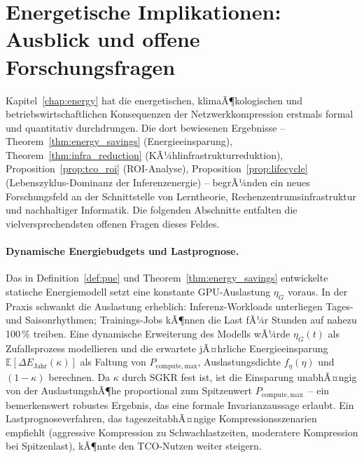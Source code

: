 ﻿\documentclass[12pt, a4paper, openany]{report}
\newcommand{\E}{\mathbb{E}}
\begin{document}
\section{Energetische Implikationen: Ausblick und offene Forschungsfragen}
\label{sec:outlook_energy}

Kapitel~\ref{chap:energy} hat die energetischen, klimaÃ¶kologischen und
betriebswirtschaftlichen Konsequenzen der Netzwerkkompression erstmals
formal und quantitativ durchdrungen.  Die dort bewiesenen Ergebnisse
-- Theorem~\ref{thm:energy_savings} (Energieeinsparung),
Theorem~\ref{thm:infra_reduction} (KÃ¼hlinfrastrukturreduktion),
Proposition~\ref{prop:tco_roi} (ROI-Analyse),
Proposition~\ref{prop:lifecycle} (Lebenszyklus-Dominanz der Inferenzenergie)
-- begrÃ¼nden ein neues Forschungsfeld an der Schnittstelle von
Lerntheorie, Rechenzentrumsinfrastruktur und nachhaltiger Informatik.
Die folgenden Abschnitte entfalten die vielversprechendsten offenen
Fragen dieses Feldes.

\paragraph{Dynamische Energiebudgets und Lastprognose.}
Das in Definition~\ref{def:pue} und Theorem~\ref{thm:energy_savings}
entwickelte statische Energiemodell setzt eine konstante GPU-Auslastung
$\eta_G$ voraus.  In der Praxis schwankt die Auslastung erheblich:
Inferenz-Workloads unterliegen Tages- und Saisonrhythmen; Trainings-Jobs
kÃ¶nnen die Last fÃ¼r Stunden auf nahezu 100\,\% treiben.  Eine dynamische
Erweiterung des Modells wÃ¼rde $\eta_G(t)$ als Zufallsprozess modellieren
und die erwartete jÃ¤hrliche Energieeinsparung
$\E[\Delta E_{\mathrm{Jahr}}(\kappa)]$ als Faltung von
$P_{\mathrm{compute,max}}$, Auslastungsdichte $f_{\eta}(\eta)$ und $(1-\kappa)$
berechnen.  Da $\kappa$ durch SGKR fest ist, ist die Einsparung
unabhÃ¤ngig von der AuslastungshÃ¶he proportional zum Spitzenwert
$P_{\mathrm{compute,max}}$~-- ein bemerkenswert robustes Ergebnis, das eine
formale Invarianzaussage erlaubt.  Ein Lastprognoseverfahren, das
tageszeit\-abhÃ¤ngige Kompressions\-szenarien empfiehlt
(aggressive Kompression zu Schwachlastzeiten, moderatere Kompression
bei Spitzenlast), kÃ¶nnte den TCO-Nutzen weiter steigern.
\end{document}
